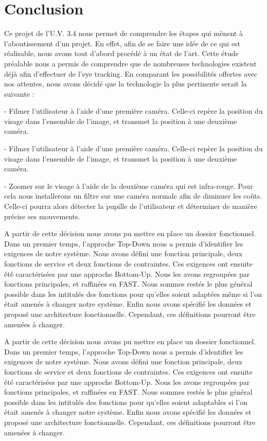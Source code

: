 \chapter{Conclusion}


Ce projet de l'U.V. 3.4 nous permet de comprendre les étapes qui mènent à l'aboutissement d'un projet. En effet, afin de se faire une idée de ce qui est réalisable, nous avons tout d'abord procédé à un état de l'art. Cette étude préalable nous a permis de comprendre que de nombreuses technologies existent déjà afin d'effectuer de l'eye tracking. En comparant les possibilités offertes avec nos attentes, nous avons décidé que la technologie la plus pertinente serait la suivante :

- Filmer l'utilisateur à l'aide d'une première caméra. Celle-ci repère la position du visage dans l'ensemble de l'image, et transmet la position à une deuxième caméra.

- Filmer l'utilisateur à l'aide d'une première caméra. Celle-ci repère la position du visage dans l'ensemble de l'image, et transmet la position à une deuxième caméra.

- Zoomer sur le visage à l'aide de la deuxième caméra qui est infra-rouge. Pour cela nous installerons  un filtre sur une caméra normale afin de diminuer les coûts. Celle-ci pourra alors détecter la pupille de l'utilisateur et déterminer de manière précise ses mouvements.

\vspace*{1cm}

A partir de cette décision nous avons pu mettre en place un dossier fonctionnel. Dans un premier temps, l'approche Top-Down nous a permis d'identifier les exigences de notre système. Nous avons défini une fonction  principale, deux fonctions de service et deux fonctions de contraintes. Ces exigences ont ensuite été caractérisées par une approche Bottom-Up. Nous les avons regroupées par fonctions principales, et raffinées en FAST. Nous sommes restés le plus général possible dans les intitulés des fonctions pour qu'elles soient adaptées même si l'on était amenés à changer notre système. Enfin nous avons spécifié les données et proposé une architecture fonctionnelle. Cependant, ces définitions pourront être amenées à changer.

A partir de cette décision nous avons pu mettre en place un dossier fonctionnel. Dans un premier temps, l'approche Top-Down nous a permis d'identifier les exigences de notre système. Nous avons défini une fonction  principale, deux fonctions de service et deux fonctions de contraintes. Ces exigences ont ensuite été caractérisées par une approche Bottom-Up. Nous les avons regroupées par fonctions principales, et raffinées en FAST. Nous sommes restés le plus général possible dans les intitulés des fonctions pour qu'elles soient adaptables si l'on était amenés à changer notre système. Enfin nous avons spécifié les données et proposé une architecture fonctionnelle. Cependant, ces définitions pourront être amenées à changer.

